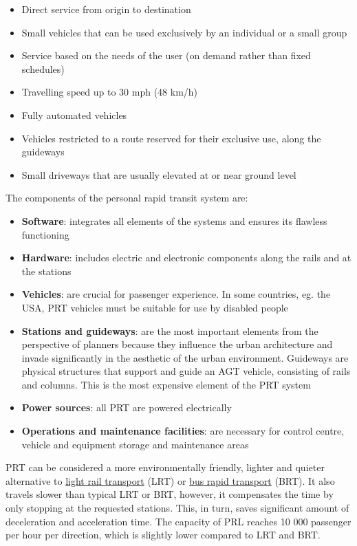 \documentclass[
]{book}
\providecommand{\tightlist}{%
  \setlength{\itemsep}{0pt}\setlength{\parskip}{0pt}}
\begin{document}
\begin{itemize}
\tightlist
\item
  Direct service from origin to destination
\item
  Small vehicles that can be used exclusively by an individual or a small group
\item
  Service based on the needs of the user (on demand rather than fixed schedules)
\item
  Travelling speed up to 30 mph (48 km/h)
\item
  Fully automated vehicles
\item
  Vehicles restricted to a route reserved for their exclusive use, along the guideways
\item
  Small driveways that are usually elevated at or near ground level
\end{itemize}

The components of the personal rapid transit system are:

\begin{itemize}
\tightlist
\item
  \textbf{Software}: integrates all elements of the systems and ensures its flawless functioning
\item
  \textbf{Hardware}: includes electric and electronic components along the rails and at the stations
\item
  \textbf{Vehicles}: are crucial for passenger experience. In some countries, eg. the USA, PRT vehicles must be suitable for use by disabled people
\item
  \textbf{Stations and guideways}: are the most important elements from the perspective of planners because they influence the urban architecture and invade significantly in the aesthetic of the urban environment. Guideways are physical structures that support and guide an AGT vehicle, consisting of rails and columns. This is the most expensive element of the PRT system
\item
  \textbf{Power sources}: all PRT are powered electrically
\item
  \textbf{Operations and maintenance facilities}: are necessary for control centre, vehicle and equipment storage and maintenance areas
\end{itemize}

PRT can be considered a more environmentally friendly, lighter and quieter alternative to \protect\hyperlink{lrt}{light rail transport} (LRT) or \protect\hyperlink{brt}{bus rapid transport} (BRT). It also travels slower than typical LRT or BRT, however, it compensates the time by only stopping at the requested stations. This, in turn, saves significant amount of deceleration and acceleration time. The capacity of PRL reaches 10 000 passenger per hour per direction, which is slightly lower compared to LRT and BRT.
\end{document}
